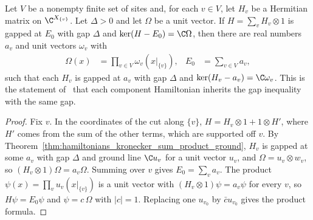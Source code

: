 \begin{theorem}
    \label{thm:hamiltonians_site_sum_product_ground}
    \leanok
    Let $V$ be a nonempty finite set of sites and, for each $v\in V$, let $H_v$
    be a Hermitian matrix on $\C^{X_{\{v\}}}$. Let $\Delta>0$ and let $\Omega$ be
    a unit vector. If $H=\sum_vH_v\otimes1$ is gapped at $E_0$ with gap $\Delta$
    and $\ker(H-E_0)=\C\Omega$, then there are real numbers $a_v$ and unit
    vectors $\omega_v$ with
    \begin{align}
        \Omega(x) & =\prod_{v\in V}\omega_v(x|_{\{v\}}), & E_0 & =\sum_{v\in V}a_v,
    \end{align}
    such that each $H_v$ is gapped at $a_v$ with gap $\Delta$ and
    $\ker(H_v-a_v)=\C\omega_v$. This is the statement
    of~\cite[Part~I, Lemma~2.1]{TNLean2026OneDimensional} that each component
    Hamiltonian inherits the gap inequality with the same gap.
\end{theorem}
\begin{proof}\leanok
    Fix $v$. In the coordinates of the cut along $\{v\}$,
    $H=H_v\otimes1+1\otimes H'$, where $H'$ comes from the sum of the other terms,
    which are supported off $v$. By
    Theorem~\ref{thm:hamiltonians_kronecker_sum_product_ground}, $H_v$ is gapped
    at some $a_v$ with gap $\Delta$ and ground line $\C u_v$ for a unit vector
    $u_v$, and $\Omega=u_v\otimes w_v$, so $(H_v\otimes1)\Omega=a_v\Omega$.
    Summing over $v$ gives $E_0=\sum_va_v$. The product
    $\psi(x)=\prod_vu_v(x|_{\{v\}})$ is a unit vector with
    $(H_v\otimes1)\psi=a_v\psi$ for every $v$, so $H\psi=E_0\psi$ and
    $\psi=c\,\Omega$ with $\lvert c\rvert=1$. Replacing one $u_{v_0}$ by
    $\bar cu_{v_0}$ gives the product formula.
\end{proof}

